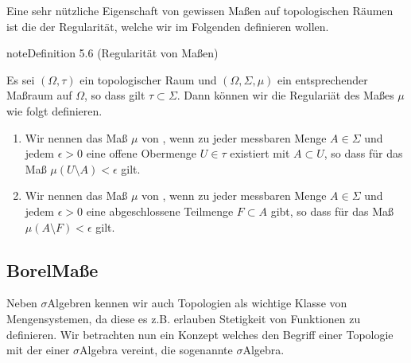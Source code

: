 \documentclass[letterpaper,10pt,german]{jupyterBook}
\begin{document}
\sphinxAtStartPar
Eine sehr nützliche Eigenschaft von gewissen Maßen auf topologischen Räumen ist die der Regularität, welche wir im Folgenden definieren wollen.
\label{masstheorie/masstheorie:def:regularitaet}
\begin{sphinxadmonition}{note}{Definition 5.6 (Regularität von Maßen)}



\sphinxAtStartPar
Es sei \((\Omega, \tau)\) ein topologischer Raum und \((\Omega, \Sigma, \mu)\) ein entsprechender Maßraum auf \(\Omega\), so dass gilt \(\tau \subset \Sigma\).
Dann können wir die Regulariät des Maßes \(\mu\) wie folgt definieren.
\begin{enumerate}
%
\item {} 
\sphinxAtStartPar
Wir nennen das Maß \(\mu\) von , wenn zu jeder messbaren Menge \(A \in \Sigma\) und jedem \(\epsilon > 0\) eine offene Obermenge \(U \in \tau\) existiert mit \(A \subset U\), so dass für das Maß \(\mu(U\setminus A) < \epsilon\) gilt.

\item {} 
\sphinxAtStartPar
Wir nennen das Maß \(\mu\) von , wenn zu jeder messbaren Menge \(A \in \Sigma\) und jedem \(\epsilon > 0\) eine abgeschlossene Teilmenge \(F \subset A\) gibt, so dass für das Maß \(\mu(A\setminus F) < \epsilon\) gilt.

\end{enumerate}
\end{sphinxadmonition}


\subsection{Borel\sphinxhyphen{}Maße}
\label{\detokenize{masstheorie/masstheorie:borel-masze}}
\sphinxAtStartPar
Neben \(\sigma\)\sphinxhyphen{}Algebren kennen wir auch Topologien als wichtige Klasse von Mengensystemen, da diese es z.B. erlauben Stetigkeit von Funktionen zu definieren. Wir betrachten nun ein Konzept welches den Begriff einer Topologie mit der einer \(\sigma\)\sphinxhyphen{}Algebra vereint, die sogenannte \sphinxhyphen{}\(\sigma\)\sphinxhyphen{}Algebra.
\end{document}
